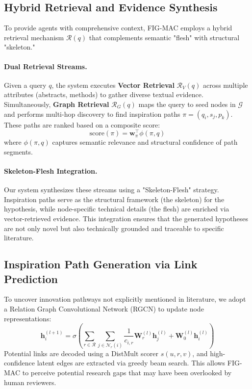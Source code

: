 \subsection{Hybrid Retrieval and Evidence Synthesis}
\label{sec:hybrid_retrieval}

To provide agents with comprehensive context, FIG-MAC employs a hybrid retrieval mechanism $\mathcal{R}(q)$ that complements semantic "flesh" with structural "skeleton."

\paragraph{Dual Retrieval Streams.}
Given a query $q$, the system executes \textbf{Vector Retrieval} $\mathcal{R}_V(q)$ across multiple attributes (abstracts, methods) to gather diverse textual evidence. Simultaneously, \textbf{Graph Retrieval} $\mathcal{R}_G(q)$ maps the query to seed nodes in $\mathcal{G}$ and performs multi-hop discovery to find inspiration paths $\pi = (q_i, s_j, p_k)$. These paths are ranked based on a composite score:
\begin{equation}
    \text{score}(\pi) = \mathbf{w}_{\pi}^\top \phi(\pi, q)
\end{equation}
where $\phi(\pi, q)$ captures semantic relevance and structural confidence of path segments.

\paragraph{Skeleton-Flesh Integration.}
Our system synthesizes these streams using a "Skeleton-Flesh" strategy. Inspiration paths serve as the structural framework (the skeleton) for the hypothesis, while node-specific technical details (the flesh) are enriched via vector-retrieved evidence. This integration ensures that the generated hypotheses are not only novel but also technically grounded and traceable to specific literature.

\subsection{Inspiration Path Generation via Link Prediction}
\label{sec:link_prediction}

To uncover innovation pathways not explicitly mentioned in literature, we adopt a Relation Graph Convolutional Network (RGCN) to update node representations:
\begin{equation}
    \mathbf{h}_i^{(l+1)} = \sigma \left( \sum_{r \in \mathcal{R}} \sum_{j \in \mathcal{N}_r(i)} \frac{1}{c_{i,r}} \mathbf{W}_r^{(l)} \mathbf{h}_j^{(l)} + \mathbf{W}_0^{(l)} \mathbf{h}_i^{(l)} \right)
\end{equation}
Potential links are decoded using a DistMult scorer $s(u, r, v)$, and high-confidence latent edges are extracted via greedy beam search. This allows FIG-MAC to perceive potential research gaps that may have been overlooked by human reviewers.

